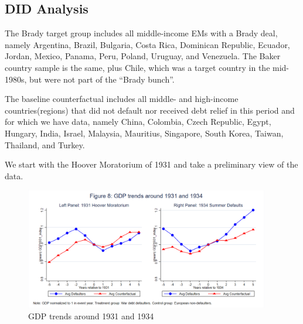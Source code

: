 \subsection{DID Analysis}

The Brady target group includes all middle-income
EMs with a Brady deal, namely Argentina, Brazil, Bulgaria, Costa Rica, Dominican
Republic, Ecuador, Jordan, Mexico, Panama, Peru, Poland, Uruguay, and Venezuela.
The Baker country sample is the same, plus Chile, which was a target country in the
mid-1980s, but were not part of the “Brady bunch”.

The baseline counterfactual includes all middle- and high-income countries(regions)
that did not default nor received debt relief in this period and for which we have data,
namely China, Colombia, Czech Republic, Egypt, Hungary, India, Israel, Malaysia,
Mauritius, Singapore, South Korea, Taiwan, Thailand, and Turkey.

We start with the Hoover Moratorium of 1931 and take a preliminary view of the
data.

\begin{figure}[ht!]
    \centering
    \includegraphics[width=0.95\textwidth]{figures/Figure8_GDP_trends_1931_1934.png}
    \caption{GDP trends around 1931 and 1934}
    \label{fig:8}
\end{figure}

